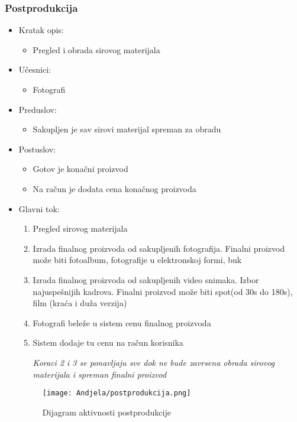 \documentclass[a4paper]{article}
\begin{document}
\subsubsection{Postprodukcija}
\begin{itemize}
    \item Kratak opis: 
    \begin{itemize}
        \item Pregled i obrada sirovog materijala 
    \end{itemize}
    \item Učesnici:
        \begin{itemize}
        \item Fotografi
    \end{itemize}
    \item Preduslov:
        \begin{itemize}
            \item Sakupljen je sav sirovi materijal spreman za obradu
        \end{itemize}
    \item Postuslov:
        \begin{itemize}
            \item Gotov je konačni proizvod
            \item Na račun je dodata cena konačnog proizvoda
            \end{itemize}
    \item Glavni tok:
        \begin{enumerate}
            \item Pregled sirovog materijala
            \item Izrada finalnog proizvoda od sakupljenih fotografija. Finalni proizvod može biti fotoalbum, fotografije u elektronskoj formi, buk
            \item Izrada finalnog proizvoda od sakupljenih video snimaka. Izbor najuspešnijih kadrova. Finalni proizvod može biti spot(od 30s do 180s), film (kraća i duža verzija)
            \item Fotografi beleže u sistem cenu finalnog proizvoda
            \item Sistem dodaje tu cenu na račun korisnika
            
            \textit{Koraci 2 i 3 se ponavljaju sve dok ne bude zavrsena obrada sirovog materijala i spreman finalni proizvod}
        \end{enumerate}
        
        \begin{figure}[H]
    \centering
\texttt{[image: Andjela/postprodukcija.png]}
    \caption{Dijagram aktivnosti postprodukcije}
    \label{fig:RegistracijaZ}
\end{figure}
        
        
\end{itemize}
\end{document}

